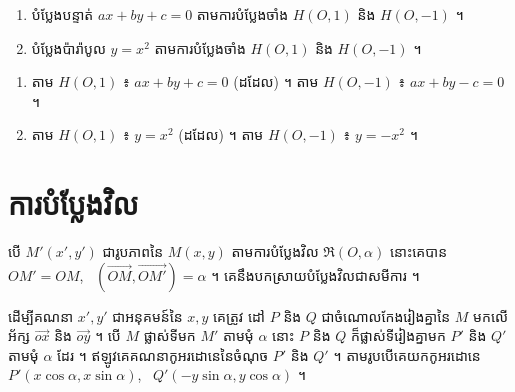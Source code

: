 \begin{pro}
\begin{enumerate}[a]
  \item បំប្លែងបន្ទាត់ $ax + by + c = 0$ តាមការបំប្លែងចាំង $H(O, 1)$ និង $H(O, -1)$ ។
  \item បំប្លែងប៉ារ៉ាបូល $y = x^2$ តាមការបំប្លែងចាំង $H(O, 1)$ និង $H(O, -1)$ ។
\end{enumerate}
\ans
\begin{enumerate}[a]
  \item តាម $H(O, 1)$ ៖ $ax + by + c = 0$ (ដដែល) ។ តាម $H(O, -1)$ ៖ $ax + by - c = 0$ ។
  \item តាម $H(O, 1)$ ៖ $y = x^2$ (ដដែល) ។ តាម $H(O, -1)$ ៖ $y = -x^2$ ។
\end{enumerate}
\end{pro}

\section{ការបំប្លែងវិល}

\begin{center}
\end{center}

បើ $M'(x', y')$ ជារូបភាពនៃ $M(x, y)$ តាមការបំប្លែងវិល $\mathfrak{R}(O, \alpha)$ នោះគេបាន $OM' = OM$, \ $(\overrightarrow{OM}, \overrightarrow{OM'}) = \alpha$ ។ គេនឹងបកស្រាយបំប្លែងវិលជាសមីការ ។

ដើម្បីគណនា $x', y'$ ជាអនុគមន៍នៃ $x, y$ គេត្រូវ ដៅ $P$ និង $Q$ ជាចំណោលកែងរៀងគ្នានៃ $M$ មកលើអ័ក្ស $\overrightarrow{ox}$ និង $\overrightarrow{oy}$ ។ បើ $M$ ផ្លាស់ទីមក $M'$ តាមមុំ $\alpha$ នោះ $P$ និង $Q$ ក៏ផ្លាស់ទីរៀងគ្នាមក $P'$ និង $Q'$ តាមមុំ $\alpha$ ដែរ ។ ឥឡូវគេគណនាកូអរដោនេនៃចំណុច $P'$ និង $Q'$ ។ តាមរូបបើគេយកកូអរដោនេ $P'(x\cos\alpha, x\sin\alpha)$, \ $Q'(-y\sin\alpha, y\cos\alpha)$ ។

